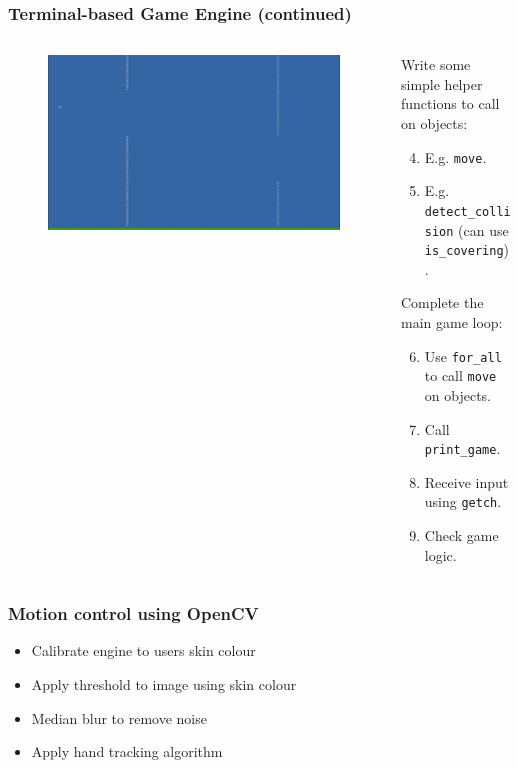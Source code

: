 \documentclass{beamer}
\begin{document}
\begin{frame}
\frametitle{Terminal-based Game Engine (continued)}
\begin{columns}
	\begin{column}{0.55\textwidth}
		\begin{figure}
			\includegraphics[width=\textwidth]{Presentation/flappy.png}
		\end{figure}
	\end{column}
	\begin{column}{0.45\textwidth}
		Write some simple helper functions to call on objects:
		\begin{enumerate}
			\setcounter{enumi}{3}
			\item E.g. \texttt{move}.
			\item E.g. \texttt{detect\_collision} (can use \texttt{is\_covering}).
		\end{enumerate}
		Complete the main game loop:
		\begin{enumerate}
			\setcounter{enumi}{5}
			\item Use \texttt{for\_all} to call \texttt{move} on objects.
			\item Call \texttt{print\_game}.
			\item Receive input using \texttt{getch}.
			\item Check game logic.
		\end{enumerate}
	\end{column}
\end{columns}
\end{frame}

\begin{frame}
\frametitle{Motion control using OpenCV}
\begin{itemize}
	\item Calibrate engine to users skin colour
	\item Apply threshold to image using skin colour
	\item Median blur to remove noise
	\item Apply hand tracking algorithm
\end{itemize}
\end{frame}
\end{document}
